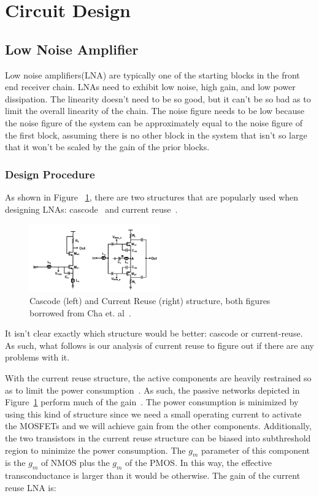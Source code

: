 \section{Circuit Design}
\subsection{Low Noise Amplifier}
Low noise amplifiers(LNA) are typically one of the starting blocks in the front end receiver chain. LNAs need to exhibit low noise, high gain, and low power dissipation. The linearity doesn't need to be so good, but it can't be so bad as to limit the overall linearity of the chain. The noise figure needs to be low because the noise figure of the system can be approximately equal to the noise figure of the first block, assuming there is no other block in the system that isn't so large that it won't be scaled by the gain of the prior blocks. 

\subsubsection{Design Procedure}
As shown in Figure ~\ref{fig:lna}, there are two structures that are popularly used when designing LNAs:  cascode~\cite{Razavi} and current reuse~\cite{lna}. 

\begin{figure}[h]
   \centering
    \includegraphics[width=0.5\textwidth]{figures/LNA.png}
    \caption{Cascode (left) and Current Reuse (right) structure, both figures borrowed from Cha et. al~\cite{lna}.}
    \label{fig:lna}
\end{figure}

It isn't clear exactly which structure would be better: cascode or current-reuse. As such, what follows is our analysis of current reuse to figure out if there are any problems with it.

With the current reuse structure, the active components are heavily restrained so as to limit the power consumption~\cite{lna}. As such, the passive networks depicted in Figure~\ref{fig:lna} perform much of the gain~\cite{lna}. The power consumption is minimized by using this kind of structure since we need a small operating current to activate the MOSFETs and we will achieve gain from the other components. Additionally, the two transistors in the current reuse structure can be biased into subthreshold region to minimize the power consumption. The $g_m$ parameter of this component is the $g_m$ of NMOS plus the $g_m$ of the PMOS. In this way, the effective transconductance is larger than it would be otherwise. The gain of the current reuse LNA is:

